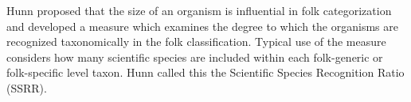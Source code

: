 \documentclass[10pt,letterpaper]{article}
\begin{document}
Hunn \cite{hunn1999size} proposed that the size of an organism is influential in folk categorization and developed a measure which examines the degree to which the organisms are recognized taxonomically in the folk classification. Typical use of the measure considers how many scientific species are included within each folk-generic or folk-specific level taxon. Hunn called this the Scientific Species Recognition Ratio (SSRR).

\end{document}

